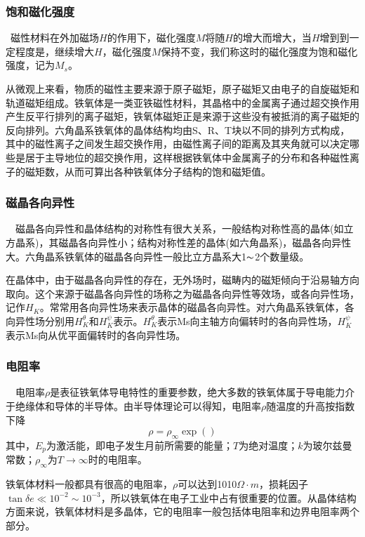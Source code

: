 \documentclass{article}
\begin{document}
\subsubsection{饱和磁化强度}

\
磁性材料在外加磁场$H$的作用下，磁化强度$M$将随$H$的增大而增大，当$H$增到到一定程度是，继续增大$H$，磁化强度$M$保持不变，我们称这时的磁化强度为饱和磁化强度，记为$M_s$。

从微观上来看，物质的磁性主要来源于原子磁矩，原子磁矩又由电子的自旋磁矩和轨道磁矩组成。铁氧体是一类亚铁磁性材料，其晶格中的金属离子通过超交换作用产生反平行排列的离子磁矩，铁氧体磁矩正是来源于这些没有被抵消的离子磁矩的反向排列。六角晶系铁氧体的晶体结构均由S、R、T块以不同的排列方式构成，其中的磁性离子之间发生超交换作用，由磁性离子间的距离及其夹角就可以决定哪些是居于主导地位的超交换作用，这样根据铁氧体中金属离子的分布和各种磁性离子的磁矩数，从而可算出各种铁氧体分子结构的饱和磁矩值。

\subsubsection{磁晶各向异性}

\ \
磁晶各向异性和晶体结构的对称性有很大关系，一般结构对称性高的晶体(如立方晶系)，其磁晶各向异性小；结构对称性差的晶体(如六角晶系)，磁晶各向异性大。六角晶系铁氧体的磁晶各向异性一般比立方晶系大1$\thicksim$2个数量级。

在晶体中，由于磁晶各向异性的存在，无外场时，磁畴内的磁矩倾向于沿易轴方向取向。这个来源于磁晶各向异性的场称之为磁晶各向异性等效场，或各向异性场，记作$H_K$。常常用各向异性场来表示晶体的磁晶各向异性。对六角晶系铁氧体，各向异性场分别用$H^{\theta}_K$和$H^{\psi}_K$表示。$H^{\theta}_K$表示Ms向主轴方向偏转时的各向异性场，$H^{\psi}_K$表示Ms向从优平面偏转时的各向异性场。

\subsubsection{电阻率}

\ \
电阻率$\rho$是表征铁氧体导电特性的重要参数，绝大多数的铁氧体属于导电能力介于绝缘体和导体的半导体。由半导体理论可以得知，电阻率$\rho$随温度的升高按指数下降
\[ \rho = \rho_{\infty} \exp \left(  \right) \]
其中，$E_p$为激活能，即电子发生月前所需要的能量；$T$为绝对温度；$k$为玻尔兹曼常数；$\rho_{\infty}$为$T
\rightarrow \infty$时的电阻率。

铁氧体材料一般都具有很高的电阻率，$\rho$可以达到1010$\Omega
\cdot m$，损耗因子$\tan \delta e \ll 10^{- 2} \sim 10^{-
3}$，所以铁氧体在电子工业中占有很重要的位置。从晶体结构方面来说，铁氧体材料是多晶体，它的电阻率一般包括体电阻率和边界电阻率两个部分。
\end{document}
